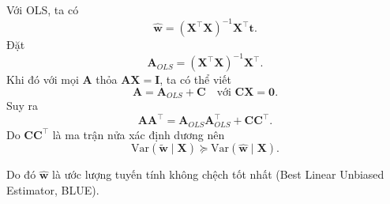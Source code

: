 Với OLS, ta có \begin{equation}
  \hat{\boldsymbol{w}} =
  (\boldsymbol{X}^{\intercal}\boldsymbol{X})^{-1}
  \boldsymbol{X}^{\intercal}\boldsymbol{t}.
\end{equation} Đặt \begin{equation}
  \boldsymbol{A}_{OLS} =
  (\boldsymbol{X}^{\intercal}\boldsymbol{X})^{-1}\boldsymbol{X}^{\intercal}.
\end{equation} Khi đó với mọi $\boldsymbol{A}$ thỏa
$\boldsymbol{A}\boldsymbol{X} = \boldsymbol{I}$, ta có thể viết
\begin{equation}
  \boldsymbol{A} = \boldsymbol{A}_{OLS} + \boldsymbol{C}
  \quad \text{với } \boldsymbol{C}\boldsymbol{X} = \boldsymbol{0}.
\end{equation} Suy ra \begin{equation}
  \boldsymbol{A}\boldsymbol{A}^{\intercal}
  = \boldsymbol{A}_{OLS}\boldsymbol{A}_{OLS}^{\intercal}
  + \boldsymbol{C}\boldsymbol{C}^{\intercal}.
\end{equation} Do $\boldsymbol{C}\boldsymbol{C}^{\intercal}$ là ma trận nửa xác
định dương nên \begin{equation}
  \mathrm{Var}(\tilde{\boldsymbol{w}} \mid \boldsymbol{X})
  \succeq
  \mathrm{Var}(\hat{\boldsymbol{w}} \mid \boldsymbol{X}).
\end{equation}

Do đó $\hat{\boldsymbol{w}}$ là ước lượng tuyến tính không chệch tốt nhất
(Best Linear Unbiased Estimator, BLUE).
